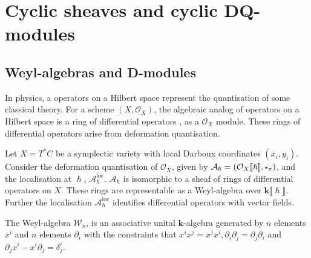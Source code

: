     
   
   \fi 
   
    \section{Cyclic sheaves and cyclic DQ-modules}
       

    \subsection{Weyl-algebras and D-modules}
    \label{sec:weyl_algebra}
    
    In physics, a operators on a Hilbert space represent the quantisation of some classical theory. For a scheme \( (X,\mathcal{O}_X)\), the algebraic analog of operators on a Hilbert space is a ring of differential operators \cite{k_holonomic}, as a \( \mathcal{O}_X\) module. These rings of differential operators arise from deformation quantisation.

    Let \(X= T^* C\) be a symplectic variety with local Darboux coordinates \( (x_i,y_i)\). Consider the deformation quantisation of \( \mathcal{O}_X\), given by \( \mathcal{A}_{\hslash} = (\mathcal{O}_X\lBrack \hslash \rBrack , \starp_{\pi}) \), and the localisation at \(\hslash\), \( \mathcal{A}_{\hslash}^{\text{loc}} \). \( \mathcal{A}_{\hslash}\) is isomorphic to a sheaf of rings of differential operators on \(X\). These rings are representable as a Weyl-algebra over \( \mathbf{k} \lBrack \hslash \rBrack\). Further the localisation \( \mathcal{A}_{\hslash}^{\text{loc}}\) identifies differential operators with vector fields. 
    

    \begin{defn} 
    The Weyl-algebra \( \mathcal{W}_{n}\), is an associative unital \( \mathbf{k}\)-algebra generated by \(n\) elements \( x^{i}\) and \(n\) elements \( \partial_i\) with the constraints that \( x^i x^j = x^j x^i, \partial_i \partial_j = \partial_j \partial_i\) and \( \partial_j x^i - x^i \partial_j  = \delta^{i}_j\).
    \end{defn}
    
